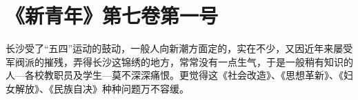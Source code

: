 
\section{《新青年》第七卷第一号} 
长沙受了“五四”运动的鼓动，一般人向新潮方面定的，实在不少，又因近年来屡受军阀派的摧残，弄得长沙这锦绣的地方，常常没有一点生气，于是一般稍有知识的人—各校教职员及学生—莫不深深痛恨。更觉得这《社会改造》、《思想革新》、《妇女解放》、《民族自决》种种问题万不容缓。